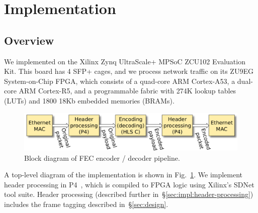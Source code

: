 \section{Implementation}
\label{sec:implementation}

\newcommand{\leicom}[1]{{\color{blue}{[\textbf{Lei Comment:} #1]}}}
\newcommand{\hg}[1]{{\color{green}{[\textbf{Hans Comment:} #1]}}}

\subsection{Overview}
We implemented \OurSys
on the Xilinx Zynq UltraScale+ MPSoC ZCU102 Evaluation Kit.  This board has 4 SFP+ cages, and we process network traffic on its
ZU9EG System-on-Chip FPGA, which consists of a quad-core ARM Cortex-A53, a
dual-core ARM Cortex-R5, and a programmable fabric with 274K lookup tables
(LUTs) and 1800 18Kb embedded memories (BRAMs).

\begin{figure}
  \centering
  \includegraphics[width=0.4\paperwidth]{Top_level.pdf}
  \caption{\label{fig:toplevel} Block diagram of FEC encoder / decoder pipeline.
  }
\end{figure}

A top-level diagram of the implementation is shown in Fig.~\ref{fig:toplevel}.
%
We implement header processing in
P4~\cite{Bosshart:2014:PPP:2656877.2656890}, which is compiled to FPGA
logic using Xilinx's SDNet tool suite.  Header processing (described
further in~\S\ref{sec:impl:header-processing}) includes the frame
tagging described in~\S\ref{sec:design}.

